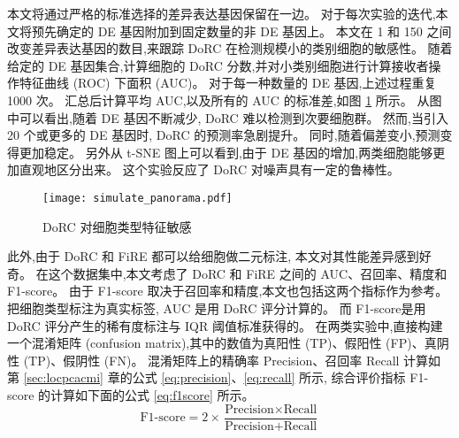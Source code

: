 本文将通过严格的标准选择的差异表达基因保留在一边。
对于每次实验的迭代,本文将预先确定的 DE 基因附加到固定数量的非 DE 基因上。
本文在 1 和 150 之间改变差异表达基因的数目,来跟踪 DoRC 在检测规模小的类别细胞的敏感性。
随着给定的 DE 基因集合,计算细胞的 DoRC 分数,并对小类别细胞进行计算接收者操作特征曲线 (ROC) 下面积 (AUC)。
对于每一种数量的 DE 基因,上述过程重复 1000 次。
汇总后计算平均 AUC,以及所有的 AUC 的标准差,如图 \ref{fig:simulate:roc} 所示。
从图中可以看出,随着 DE 基因不断减少, DoRC 难以检测到次要细胞群。
然而,当引入 20 个或更多的 DE 基因时, DoRC 的预测率急剧提升。
同时,随着偏差变小,预测变得更加稳定。
另外从 t-SNE 图上可以看到,由于 DE 基因的增加,两类细胞能够更加直观地区分出来。
这个实验反应了 DoRC 对噪声具有一定的鲁棒性。

\begin{figure}[!htbp]
    \centering
    \texttt{[image: simulate\_panorama.pdf]}
    \caption{
    DoRC 对细胞类型特征敏感
    }
    \label{fig:simulate:roc}
\end{figure}

此外,由于 DoRC 和 FiRE 都可以给细胞做二元标注,
本文对其性能差异感到好奇。
在这个数据集中,本文考虑了 DoRC 和 FiRE 之间的 AUC、召回率、精度和 F1-score。
由于 F1-score 取决于召回率和精度,本文也包括这两个指标作为参考。
把细胞类型标注为真实标签, AUC 是用 DoRC 评分计算的。
而 F1-score是用 DoRC 评分产生的稀有度标注与 IQR 阈值标准获得的。
在两类实验中,直接构建一个混淆矩阵 (confusion matrix),其中的数值为真阳性 (TP)、假阳性 (FP)、真阴性 (TP)、假阴性 (FN)。
混淆矩阵上的精确率 Precision、召回率 Recall 计算如第 \ref{sec:locpcacmi} 章的公式 \ref{eq:precision}、\ref{eq:recall} 所示,
综合评价指标 F1-score 的计算如下面的公式 \ref{eq:f1score} 所示。
\begin{equation}
\label{eq:f1score}
\text{F1-score} = 2 \times \frac{\text{Precision} \times \text{Recall}}{ \text{Precision} + \text{Recall}}
\end{equation}

